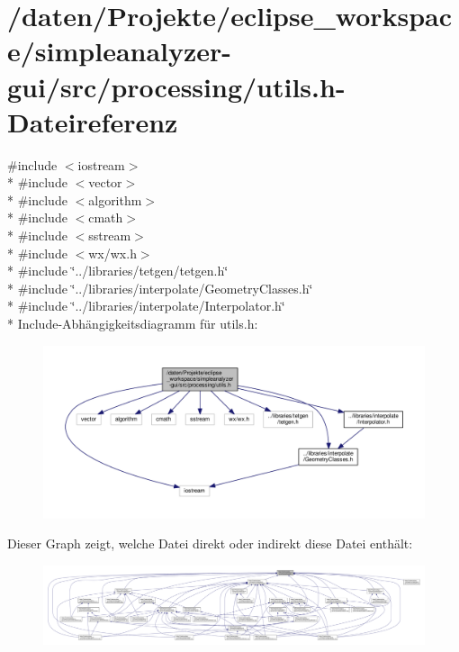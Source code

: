 \hypertarget{simpleanalyzer-gui_2src_2processing_2utils_8h}{\section{/daten/\-Projekte/eclipse\-\_\-workspace/simpleanalyzer-\/gui/src/processing/utils.h-\/\-Dateireferenz}
\label{simpleanalyzer-gui_2src_2processing_2utils_8h}
}
{\ttfamily \#include $<$iostream$>$}\\*
{\ttfamily \#include $<$vector$>$}\\*
{\ttfamily \#include $<$algorithm$>$}\\*
{\ttfamily \#include $<$cmath$>$}\\*
{\ttfamily \#include $<$sstream$>$}\\*
{\ttfamily \#include $<$wx/wx.\-h$>$}\\*
{\ttfamily \#include \char`\"{}../libraries/tetgen/tetgen.\-h\char`\"{}}\\*
{\ttfamily \#include \char`\"{}../libraries/interpolate/\-Geometry\-Classes.\-h\char`\"{}}\\*
{\ttfamily \#include \char`\"{}../libraries/interpolate/\-Interpolator.\-h\char`\"{}}\\*
Include-\/\-Abhängigkeitsdiagramm für utils.\-h\-:
\nopagebreak
\begin{figure}[H]
\begin{center}
\leavevmode
\includegraphics[width=350pt]{simpleanalyzer-gui_2src_2processing_2utils_8h__incl}
\end{center}
\end{figure}
Dieser Graph zeigt, welche Datei direkt oder indirekt diese Datei enthält\-:
\nopagebreak
\begin{figure}[H]
\begin{center}
\leavevmode
\includegraphics[width=350pt]{simpleanalyzer-gui_2src_2processing_2utils_8h__dep__incl}
\end{center}
\end{figure}
